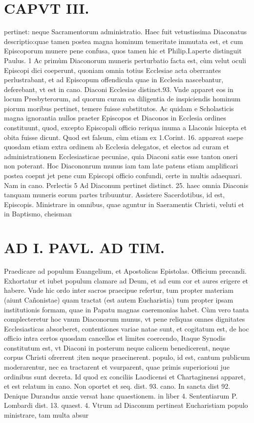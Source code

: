 \documentclass{article}
\begin{document}
\begin{pages}
\section*{CAPVT  III. }
\marginpar{[ p.163 ]}\pstart pertinet: neque Sacramentorum administratio. Haec fuit vetustissima Diaconatus descriptio:quae tamen postea magna hominum temeritate immutata est, et cum Episcoporum munere pene confusa, quos tamen hic et Philip.I.aperte distinguit Paulus. 1  \pend\pstart Ac primùm Diaconorum muneris perturbatio facta est, cùm velut oculi Episcopi dici coeperunt, quoniam omnia totius Ecclesiae acta oberrantes perlustrabant, et ad Episcopum offendicula quae in Ecclesia nascebantur, deferebant, vt est in cano. Diaconi Ecclesiae distinct.93. Vnde apparet eos in locum Presbyterorum, ad quorum curam ea diligentia de inspiciendis hominum piorum moribus pertinet, temere fuisse substitutos. Ac quidam e Scholasticis magna ignorantia nullos praeter Episcopos et Diaconos in Ecclesia ordines constituunt, quod, excepto Episcopali officio reriqua inuma a Llaconis luicepta et obita fuisse dicunt. Quod est falsum, cùm etiam ex 1.Corint. 16. appareat saepe quosdam etiam extra ordinem ab Ecclesia delegatos, et electos ad curam et administrationem Ecclesiasticae pecuniae, quia Diaconi satis esse tanton oneri non poterant.  \pend\pstart Hoc Diacononrum munus iam tam late patens etiam amplificari postea coepnt jet pene cum Episcopi officio confundi, certe in multis adaequari. Nam in cano. Perlectis 5 Ad Diaconum pertinet distinct. 25. haec omnia Diaconis tanquam muneris eorum partes tribuuntur.  \pend{} Assistere Sacerdotibus, id est, Episcopis.  \pend{} Ministrare in omnibus, quae aguntur in Saeramentis Christi, veluti et in Baptismo, cheisman\pend
\section*{AD I. PAVL. AD TIM. }
\marginpar{[ p.164 ]} Praedicare ad populum Euangelium, et Apostolicas Epistolas.  \pend\pstart Officium precandi.  \pend{} Exhortatur et iubet populum clamare ad Deum, et ad eum cor et aures erigere et habere.  \pend\pstart Vnde hic ordo inter sacros praecipue refertur, tum propter materiam (aiunt Cañonistae) quam tractat (est autem Eucharistia) tum propter ipsam institutionis formam, quae in Papatu magnas caeremonias habet.  \pend\pstart Cùm vero tanta complecteretur hoc vnum Diaconorum munus, vt pene reliquas omnes dignitates Ecclesiasticas absorberet, contentiones variae natae sunt, et cogitatum est, de hoc officio intra certos quosdam cancellos et limites coercendo, Itaque Synodis constitutum est, vt Diaconi in posterum neque calicem benedicerent, neque corpus Christi ofrerrent ;iten neque praecinerent. populo, id est, cantum publicum moderarentur, nec ea tractarent et vsurparent, quae primis superiorioui jue ordinibus sunt decreta. Id quod ex conciliis Laodicensi et Chartaginensi apparet, et est relatum in cano. Non oportet et seq. dist. 93. cano. In sancta dist 92.  \pend\pstart Denique Durandus anxie versat hanc quaestionem. in liber 4. Sententiarum P. Lombardi dist. 13. quaest. 4. Vtrum ad Diaconum pertineat Eucharistiam populo ministrare, tam multa absur\pend

\end{pages}
\end{document}
